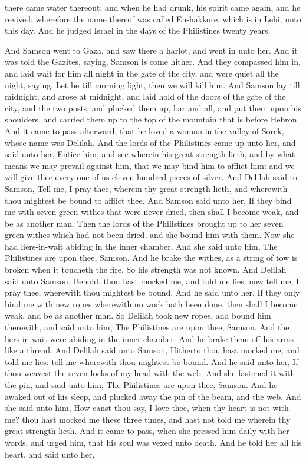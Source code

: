 there came water thereout; and when he had drunk, his spirit came again, and he revived: wherefore the name thereof was called En-hakkore, which is in Lehi, unto this day. And he judged Israel in the days of the Philistines twenty years. 

And Samson went to Gaza, and saw there a harlot, and went in unto her. And it was told the Gazites, saying, Samson is come hither. And they compassed him in, and laid wait for him all night in the gate of the city, and were quiet all the night, saying, Let be till morning light, then we will kill him. And Samson lay till midnight, and arose at midnight, and laid hold of the doors of the gate of the city, and the two posts, and plucked them up, bar and all, and put them upon his shoulders, and carried them up to the top of the mountain that is before Hebron.  And it came to pass afterward, that he loved a woman in the valley of Sorek, whose name was Delilah. And the lords of the Philistines came up unto her, and said unto her, Entice him, and see wherein his great strength lieth, and by what means we may prevail against him, that we may bind him to afflict him: and we will give thee every one of us eleven hundred pieces of silver. And Delilah said to Samson, Tell me, I pray thee, wherein thy great strength lieth, and wherewith thou mightest be bound to afflict thee. And Samson said unto her, If they bind me with seven green withes that were never dried, then shall I become weak, and be as another man. Then the lords of the Philistines brought up to her seven green withes which had not been dried, and she bound him with them. Now she had liers-in-wait abiding in the inner chamber. And she said unto him, The Philistines are upon thee, Samson. And he brake the withes, as a string of tow is broken when it toucheth the fire. So his strength was not known.  And Delilah said unto Samson, Behold, thou hast mocked me, and told me lies: now tell me, I pray thee, wherewith thou mightest be bound. And he said unto her, If they only bind me with new ropes wherewith no work hath been done, then shall I become weak, and be as another man. So Delilah took new ropes, and bound him therewith, and said unto him, The Philistines are upon thee, Samson. And the liers-in-wait were abiding in the inner chamber. And he brake them off his arms like a thread.  And Delilah said unto Samson, Hitherto thou hast mocked me, and told me lies: tell me wherewith thou mightest be bound. And he said unto her, If thou weavest the seven locks of my head with the web. And she fastened it with the pin, and said unto him, The Philistines are upon thee, Samson. And he awaked out of his sleep, and plucked away the pin of the beam, and the web.  And she said unto him, How canst thou say, I love thee, when thy heart is not with me? thou hast mocked me these three times, and hast not told me wherein thy great strength lieth. And it came to pass, when she pressed him daily with her words, and urged him, that his soul was vexed unto death. And he told her all his heart, and said unto her, 
